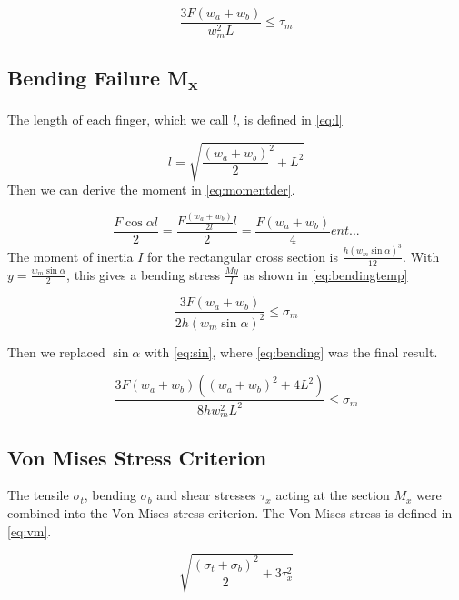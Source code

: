 \begin{equation}
	\label{eq:shearMz}
	\frac{ 3 F \left(w_a + w_b \right) }{ w_m ^2 L} \le \tau_m	
\end{equation}


\subsection{Bending Failure M\textsubscript{x}}
The length of each finger, which we call $l$, is defined in \autoref{eq:l}

\begin{equation}
	\label{eq:l}
	l = \sqrt{ \frac{\left( w_a + w_b \right)}{2} ^2 + L^2 }
\end{equation}
Then we can derive the moment in \autoref{eq:momentder}.

\begin{equation}
	\label{eq:momentder}
	\frac{F \cos \alpha l}{2} =  \frac{F \frac{\left(w_a + w_b \right)}{2l} l}{2} = \frac{F \left(w_a + w_b\right)}{4}ent...
\end{equation}
The moment of inertia $I$ for the rectangular cross section is $\frac{h \left(w_m \sin \alpha \right)^3}{12}$. With $y = \frac{w_m \sin \alpha }{2}$, this gives a bending stress $\frac{M y}{I}$ as shown in \autoref{eq:bendingtemp}

\begin{equation}
	\label{eq:bendingtemp}
	\frac{3 F\left(w_a + w_b \right)}{2 h \left( w_m \sin \alpha \right)^2 } \le \sigma_m
\end{equation}

Then we replaced $\sin \alpha$ with \ref{eq:sin}, where \autoref{eq:bending} was the final result.

\begin{equation}
	\label{eq:bending}
	\frac{ 3 F \left(w_a + w_b \right) \left(\left(w_a + w_b \right) ^2 + 4L^2 \right)  }{ 8h w_m^2 L^2 }  \le \sigma_m
\end{equation}

\subsection{Von Mises Stress Criterion}
The tensile $\sigma_t$, bending $\sigma_b$ and shear stresses $\tau_x$ acting at the section $M_x$ were combined into the Von Mises stress criterion. The Von Mises stress is defined in \autoref{eq:vm}.

\begin{equation}
	\label{eq:vm}
	\sqrt{\frac{\left( \sigma_t + \sigma_b \right)^2}{2} + 3\tau_x ^2}
\end{equation}

